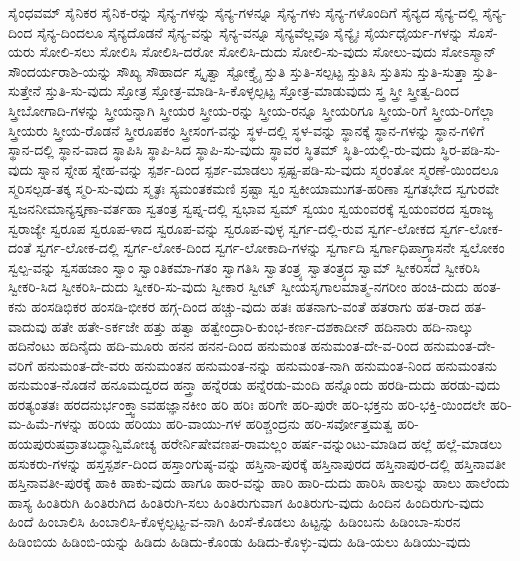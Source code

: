 {ಸೈಂಧವಮ್
ಸೈನಿಕರ
ಸೈನಿಕ-ರನ್ನು
ಸೈನ್ಯ-ಗಳನ್ನು
ಸೈನ್ಯ-ಗಳನ್ನೂ
ಸೈನ್ಯ-ಗಳು
ಸೈನ್ಯ-ಗಳೊಂದಿಗೆ
ಸೈನ್ಯದ
ಸೈನ್ಯ-ದಲ್ಲಿ
ಸೈನ್ಯ-ದಿಂದ
ಸೈನ್ಯ-ದಿಂದಲೂ
ಸೈನ್ಯದೊಡನೆ
ಸೈನ್ಯ-ವನ್ನು
ಸೈನ್ಯ-ವನ್ನೂ
ಸೈನ್ಯವೆಲ್ಲವೂ
ಸೈನ್ಯೈಃ
ಸೈರ್ಯಧೈರ್ಯ-ಗಳನ್ನು
ಸೊಸೆ-ಯರು
ಸೋಲಿ-ಸಲು
ಸೋಲಿಸಿ
ಸೋಲಿಸಿ-ದರೋ
ಸೋಲಿಸಿ-ದುದು
ಸೋಲಿ-ಸು-ವುದು
ಸೋಲು-ವುದು
ಸೋಽಸ್ಮಾನ್
ಸೌಂದರ್ಯರಾಶಿ-ಯನ್ನು
ಸೌಖ್ಯ
ಸೌಹಾರ್ದ
ಸ್ಕೃತ್ವಾ
ಸ್ಟೋಕ್ತ್ಯೈ
ಸ್ತುತಿ
ಸ್ತುತಿ-ಸಲ್ಪಟ್ಟ
ಸ್ತುತಿಸಿ
ಸ್ತುತಿಸು
ಸ್ತುತಿ-ಸುತ್ತಾ
ಸ್ತುತಿ-ಸುತ್ತೇನೆ
ಸ್ತುತಿ-ಸು-ವುದು
ಸ್ತೋತ್ರ
ಸ್ತೋತ್ರ-ಮಾಡಿ-ಸಿ-ಕೊಳ್ಳಲ್ಪಟ್ಟ
ಸ್ತೋತ್ರ-ಮಾಡುವುದು
ಸ್ತ್ರ
ಸ್ತ್ರೀ
ಸ್ತ್ರೀತ್ವ-ದಿಂದ
ಸ್ತ್ರೀಬೋಗಾದಿ-ಗಳನ್ನು
ಸ್ತ್ರೀಯನ್ನಾಗಿ
ಸ್ತ್ರೀಯರ
ಸ್ತ್ರೀಯ-ರನ್ನು
ಸ್ತ್ರೀಯ-ರನ್ನೂ
ಸ್ತ್ರೀಯರಿಗೂ
ಸ್ತ್ರೀಯ-ರಿಗೆ
ಸ್ತ್ರೀಯ-ರಿಗೆಲ್ಲಾ
ಸ್ತ್ರೀಯರು
ಸ್ತ್ರೀಯ-ರೊಡನೆ
ಸ್ತ್ರೀರೂಪಕಂ
ಸ್ತ್ರೀಸಂಗ-ವನ್ನು
ಸ್ಥಳ-ದಲ್ಲಿ
ಸ್ಥಳ-ವನ್ನು
ಸ್ಥಾನಕ್ಕೆ
ಸ್ಥಾನ-ಗಳನ್ನು
ಸ್ಥಾನ-ಗಳಿಗೆ
ಸ್ಥಾನ-ದಲ್ಲಿ
ಸ್ಥಾನ-ವಾದ
ಸ್ಥಾಪಿಸಿ
ಸ್ಥಾಪಿ-ಸಿದ
ಸ್ಥಾಪಿ-ಸು-ವುದು
ಸ್ಥಾವರ
ಸ್ಥಿತಮ್
ಸ್ಥಿತಿ-ಯಲ್ಲಿ-ರು-ವುದು
ಸ್ಥಿರ-ಪಡಿ-ಸು-ವುದು
ಸ್ನಾನ
ಸ್ನೇಹ
ಸ್ನೇಹ-ವನ್ನು
ಸ್ಪರ್ಶ-ದಿಂದ
ಸ್ಪರ್ಶ-ಮಾಡಲು
ಸ್ಪಷ್ಟ-ಪಡಿ-ಸು-ವುದು
ಸ್ಮರಂತೋ
ಸ್ಮರಣೆ-ಯಿಂದಲೂ
ಸ್ಮರಿಸಲ್ಪಡ-ತಕ್ಕ
ಸ್ಮರಿ-ಸು-ವುದು
ಸ್ಮೃತಃ
ಸ್ಯಮಂತಕಮಣಿ
ಸ್ರಷ್ಟಾ
ಸ್ವಂ
ಸ್ವಕೀಯಾಮುಗತ-ಹರಿಣಾ
ಸ್ವಗತಭೇದ
ಸ್ವಗುರವೇ
ಸ್ವಜನನೀಮಾನ್ಯಸ್ತೃಣಾ-ವರ್ತಹಾ
ಸ್ವತಂತ್ರ
ಸ್ವಪ್ನ-ದಲ್ಲಿ
ಸ್ವಭಾವ
ಸ್ವಮ್
ಸ್ವಯಂ
ಸ್ವಯಂವರಕ್ಕೆ
ಸ್ವಯಂವರದ
ಸ್ವರಾಜ್ಯ
ಸ್ವರಾಜ್ಯೇ
ಸ್ವರೂಪ
ಸ್ವರೂಪ-ಳಾದ
ಸ್ವರೂಪ-ವನ್ನು
ಸ್ವರೂಪ-ವುಳ್ಳ
ಸ್ವರ್ಗ-ದಲ್ಲಿ-ರುವ
ಸ್ವರ್ಗ-ಲೋಕದ
ಸ್ವರ್ಗ-ಲೋಕ-ದಂತೆ
ಸ್ವರ್ಗ-ಲೋಕ-ದಲ್ಲಿ
ಸ್ವರ್ಗ-ಲೋಕ-ದಿಂದ
ಸ್ವರ್ಗ-ಲೋಕಾದಿ-ಗಳನ್ನು
ಸ್ವರ್ಗಾದಿ
ಸ್ವರ್ಗಾಧಿಪಾಗ್ರ್ಯಾಸನೇ
ಸ್ವಲೋಕಂ
ಸ್ವಲ್ಪ-ವನ್ನು
ಸ್ವಸಹಜಾಂ
ಸ್ವಾಂ
ಸ್ವಾಂತಿಕಮಾ-ಗತಂ
ಸ್ವಾಗತಿಸಿ
ಸ್ವಾತಂತ್ರ್ಯ
ಸ್ವಾತಂತ್ರ್ಯದ
ಸ್ವಾಮ್
ಸ್ವೀಕರಿಸದೆ
ಸ್ವೀಕರಿಸಿ
ಸ್ವೀಕರಿ-ಸಿದ
ಸ್ವೀಕರಿಸಿ-ದುದು
ಸ್ವೀಕರಿ-ಸು-ವುದು
ಸ್ವೀಕಾರ
ಸ್ವೀಟ್
ಸ್ವೀಯಸೃಗಾಲಮಾತ್ಮ-ನಗರೀಂ
ಹಂಚಿ-ದುದು
ಹಂತ-ಕನು
ಹಂಸಡಿಭಿಕರ
ಹಂಸಡಿ-ಭೀಕರ
ಹಗ್ಗ-ದಿಂದ
ಹಚ್ಚು-ವುದು
ಹತಃ
ಹತನಾಗು-ವಂತೆ
ಹತರಾಗು
ಹತ-ರಾದ
ಹತ-ವಾದುವು
ಹತೇ
ಹತೇ-ಽರ್ಕಜೇ
ಹತ್ತು
ಹತ್ವಾ
ಹತ್ವೇಂದ್ರಾರಿ-ಕುಂಭ-ಕರ್ಣ-ದಶಕಾದೀನ್
ಹದಿನಾರು
ಹದಿ-ನಾಲ್ಕು
ಹದಿನೆಂಟು
ಹದಿನೈದು
ಹದಿ-ಮೂರು
ಹನನ
ಹನನ-ದಿಂದ
ಹನುಮಂತ
ಹನುಮಂತ-ದೇ-ವ-ರಿಂದ
ಹನುಮಂತ-ದೇ-ವರಿಗೆ
ಹನುಮಂತ-ದೇ-ವರು
ಹನುಮಂತನ
ಹನುಮಂತ-ನನ್ನು
ಹನುಮಂತ-ನಾಗಿ
ಹನುಮಂತ-ನಿಂದ
ಹನುಮಂತನು
ಹನುಮಂತ-ನೊಡನೆ
ಹನೂಮದ್ವರದ
ಹನ್ತ್ರಾ
ಹನ್ನೆರಡು
ಹನ್ನೆರಡು-ಮಂದಿ
ಹನ್ನೊಂದು
ಹರಡಿ-ದುದು
ಹರಡು-ವುದು
ಹರತ್ಯಂತತಃ
ಹರದನುರ್ಭಂಕ್ತ್ವಾಽವಹಜ್ಞಾನಕೀಂ
ಹರಿ
ಹರಿಃ
ಹರಿಗೇ
ಹರಿ-ಪುರೇ
ಹರಿ-ಭಕ್ತನು
ಹರಿ-ಭಕ್ತಿ-ಯಿಂದಲೇ
ಹರಿ-ಮ-ಹಿಮೆ-ಗಳನ್ನು
ಹರಿಯ
ಹರಿಯು
ಹರಿ-ವಾಯು-ಗಳ
ಹರಿಶ್ಚಂದ್ರನು
ಹರಿ-ಸರ್ವೋತ್ತಮತ್ವ
ಹರಿ-ಹಯಪುರುಷವ್ರಾತಬದ್ಧಾನ್ವಿಮೋಚ್ಯ
ಹರೇರ್ನಿಷೇವಣಪ-ರಾಮಲ್ಲಂ
ಹರ್ಷ-ವನ್ನುಂಟು-ಮಾಡಿದ
ಹಲ್ಲೆ
ಹಲ್ಲೆ-ಮಾಡಲು
ಹಸುಕರು-ಗಳನ್ನು
ಹಸ್ತಸ್ಪರ್ಶ-ದಿಂದ
ಹಸ್ತಾಂಗುಷ್ಠ-ವನ್ನು
ಹಸ್ತಿನಾ-ಪುರಕ್ಕೆ
ಹಸ್ತಿನಾಪುರದ
ಹಸ್ತಿನಾಪುರ-ದಲ್ಲಿ
ಹಸ್ತಿನಾವತೀ
ಹಸ್ತಿನಾವತೀ-ಪುರಕ್ಕೆ
ಹಾಕಿ
ಹಾಕು-ವುದು
ಹಾಗೂ
ಹಾರ-ವನ್ನು
ಹಾರಿ
ಹಾರಿ-ದುದು
ಹಾರಿಸಿ
ಹಾಲನ್ನು
ಹಾಲು
ಹಾಲೆಂದು
ಹಾಸ್ಯ
ಹಿಂತಿರುಗಿ
ಹಿಂತಿರುಗಿದ
ಹಿಂತಿರುಗಿ-ಸಲು
ಹಿಂತಿರುಗುವಾಗ
ಹಿಂತಿರುಗು-ವುದು
ಹಿಂದಿನ
ಹಿಂದಿರುಗು-ವುದು
ಹಿಂದೆ
ಹಿಂಬಾಲಿಸಿ
ಹಿಂಬಾಲಿಸಿ-ಕೊಳ್ಳಲ್ಪಟ್ಟ-ವ-ನಾಗಿ
ಹಿಂಸೆ-ಕೊಡಲು
ಹಿಟ್ಟನ್ನು
ಹಿಡಿಂಬನು
ಹಿಡಿಂಬಾ-ಸುರನ
ಹಿಡಿಂಬಿಯ
ಹಿಡಿಂಬಿ-ಯನ್ನು
ಹಿಡಿದು
ಹಿಡಿದು-ಕೊಂಡು
ಹಿಡಿದು-ಕೊಳ್ಳು-ವುದು
ಹಿಡಿ-ಯಲು
ಹಿಡಿಯು-ವುದು
}
